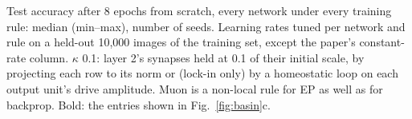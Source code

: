 \begin{table}[tbp]
\centering\small
\caption{Test accuracy after 8 epochs from scratch, every network under every training rule: median (min--max), number
of seeds. Learning rates tuned per network and rule on a held-out 10,000 images of the training set, except the paper's
constant-rate column. $\kappa$ 0.1: layer 2's synapses held at 0.1 of their initial scale, by projecting each row to
its norm or (lock-in only) by a homeostatic loop on each output unit's drive amplitude. Muon is a non-local rule for
EP as well as for backprop. Bold: the entries shown in Fig.~\ref{fig:basin}c.}
\label{tab:fig6c_rules}
\resizebox{\textwidth}{!}{}
\end{table}
